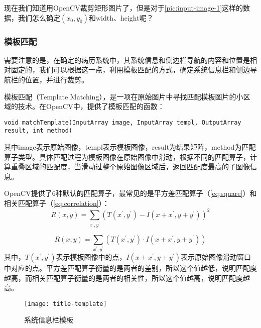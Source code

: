 现在我们知道用OpenCV裁剪矩形图片了，但是对于\autoref{pic:input-image-1}这样的数据，我们怎么确定$(x_0,y_0)$和width、height呢？

\subsubsection*{模板匹配}
需要注意的是，在确定的病历系统中，其系统信息和侧边栏导航的内容和位置是相对固定的，我们可以根据这一点，利用模板匹配的方式，确定系统信息栏和侧边导航栏的位置，并进行裁剪。

模板匹配（Template Matching）\citep{template-matching}，是一项在原始图片中寻找匹配模板图片的小区域的技术。在OpenCV中，提供了模板匹配的函数：
\begin{lstlisting}
void matchTemplate(InputArray image, InputArray templ, OutputArray result, int method)
\end{lstlisting}
其中image表示原始图像，templ表示模板图像，result为结果矩阵，method为匹配算子类型。具体匹配过程为模板图像在原始图像中滑动，根据不同的匹配算子，计算重叠区域的匹配度，当滑动过整个原始图像区域后，返回匹配度最高的子图像信息。

OpenCV提供了6种默认的匹配算子，最常见的是平方差匹配算子（\autoref{eq:square}）和相关匹配算子（\autoref{eq:correlation}）：
\begin{equation} \label{eq:square}
R(x,y)=\sum_{x^{'},y^{'}}(T(x^{'},y^{'})-I(x+x^{'},y+y^{'}))^2
\end{equation}

\begin{equation} \label{eq:correlation}
R(x,y)=\sum_{x^{'},y^{'}}(T(x^{'},y^{'})\cdot I(x+x^{'},y+y^{'}))
\end{equation}
其中，$T(x^{'},y^{'})$表示模板图像中的点，$I(x+x^{'},y+y^{'})$表示原始图像滑动窗口中对应的点。平方差匹配算子衡量的是两者的差别，所以这个值越低，说明匹配度越高，而相关匹配算子衡量的是两者的相关性，所以这个值越高，说明匹配度越高。

\begin{figure}[htbp]
	\centering
	\caption{系统信息栏模板}
	\texttt{[image: title-template]}
	\label{pic:title-template}
\end{figure}


